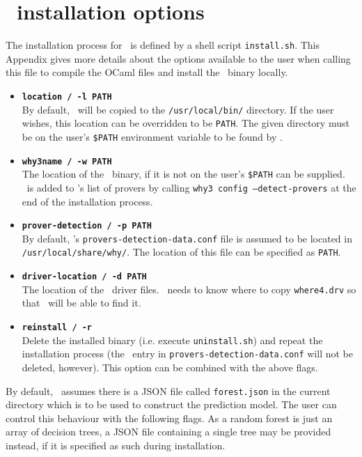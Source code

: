 \chapter{\where~installation options}
\thispagestyle{nohead}
\label{App:install}

The installation process for \where~is defined by a shell script \texttt{install.sh}.
This Appendix gives more details about the options available to the user when calling this file to compile the OCaml files and install the \where~binary locally.

\begin{itemize}[leftmargin=*]
	\item[] \textbf{\texttt{\textendash\textendash location / -l PATH}} \\ By default, \where~will be copied to the \texttt{/usr/local/bin/} directory.
	If the user wishes, this location can be overridden to be \texttt{PATH}. The given directory must be on the user's \texttt{\$PATH} environment variable to be found by \why. 
	\item[] \textbf{\texttt{\textendash\textendash why3name / -w PATH}} \\ The location of the \why~binary, if it is not on the user's \texttt{\$PATH} can be supplied. \where~is added to \why's list of provers by calling \texttt{why3 config --detect-provers} at the end of the installation process. 
	\item[] \textbf{\texttt{\textendash\textendash prover-detection / -p PATH}} \\ By default, \why's \texttt{provers-detection-data.conf} file is assumed to be located in \texttt{/usr/local/share/why/}. The location of this file can be specified as \texttt{PATH}.
	\item[] \textbf{\texttt{\textendash\textendash driver-location / -d PATH}} \\ The location of the \why~driver files. \where~needs to know where to copy \texttt{where4.drv} so that \why~will be able to find it.
	\item[] \textbf{\texttt{\textendash\textendash reinstall / -r}} \\ Delete the installed binary (i.e. execute \texttt{uninstall.sh}) and repeat the installation process (the \where~entry in \texttt{provers-detection-data.conf} will not be deleted, however). This option can be combined with the above flags.   
\end{itemize}

By default, \where~assumes there is a JSON file called \texttt{forest.json} in the current directory which is to be used to construct the prediction model.
The user can control this behaviour with the following flags.
As a random forest is just an array of decision trees, a JSON file containing a single tree may be provided instead, if it is specified as such during installation.

